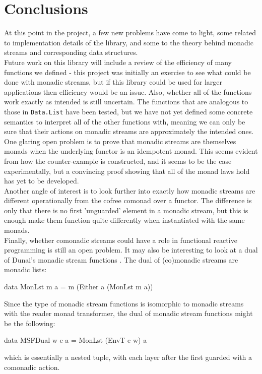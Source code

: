 \section{Conclusions}

At this point in the project, a few new problems have come to light, some related to implementation details of the library, and some to the theory behind monadic streams and corresponding data structures. \\

Future work on this library will include a review of the efficiency of many functions we defined - this project was initially an exercise to see what could be done with monadic streams, but if this library could be used for larger applications then efficiency would be an issue. Also, whether all of the functions work exactly as intended is still uncertain. The functions that are analogous to those in \verb+Data.List+ have been tested, but we have not yet defined some concrete semantics to interpret all of the other functions with, meaning we can only be sure that their actions on monadic streams are approximately the intended ones. \\

One glaring open problem is to prove that monadic streams are themselves monads when the underlying functor is an idempotent monad. This seems evident from how the counter-example is constructed, and it seems to be the case experimentally, but a convincing proof showing that all of the monad laws hold has yet to be developed. \\

Another angle of interest is to look further into exactly how monadic streams are different operationally from the cofree comonad over a functor. The difference is only that there is no first 'unguarded' element in a monadic stream, but this is enough make them function quite differently when instantiated with the same monads. \\

Finally, whether comonadic streams could have a role in functional reactive programming is still an open problem. It may also be interesting to look at a dual of Dunai's monadic stream functions \cite{dunai}. The dual of (co)monadic streams are monadic lists:
\begin{haskell}
data MonLst m a = m (Either a (MonLst m a)) 
\end{haskell}
Since the type of monadic stream functions is isomorphic to monadic streams with the reader monad transformer, the dual of monadic stream functions might be the following:
\begin{haskell}
data MSFDual w e a = MonLst (EnvT e w) a
\end{haskell}
which is essentially a nested tuple, with each layer after the first guarded with a comonadic action. 

